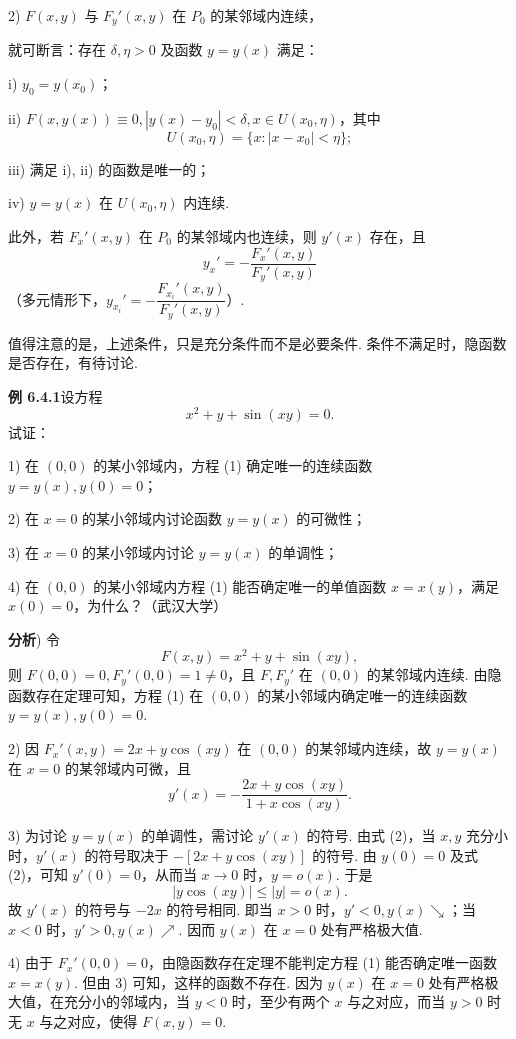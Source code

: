 \documentclass[UTF8,12pt,a4paper,fontset=fandol]{ctexart}
\begin{document}
2) $F(x,y)$ 与 $F_y'(x,y)$ 在 $P_0$ 的某邻域内连续，

\noindent 就可断言：存在 $\delta,\eta>0$ 及函数 $y=y(x)$ 满足：

i) $y_0=y(x_0)$；

ii) $F(x,y(x))\equiv0,|y(x)-y_0|<\delta,x\in U(x_0,\eta)$，其中
\[
  U(x_0,\eta)=\{x:|x-x_0|<\eta\};
\]

iii) 满足 i), ii) 的函数是唯一的；

iv) $y=y(x)$ 在 $U(x_0,\eta)$ 内连续.

此外，若 $F_x'(x,y)$ 在 $P_0$ 的某邻域内也连续，则 $y'(x)$ 存在，且
\[
  y_x'=-\frac{F_x'(x,y)}{F_y'(x,y)}
\]
（多元情形下，$y_{x_i}'=-\dfrac{F_{x_i}'(x,y)}{F_y'(x,y)}$）.

\noindent 值得注意的是，上述条件，只是充分条件而不是必要条件. 条件不满足时，隐函数是否存在，有待讨论.

\noindent\textbf{例 6.4.1}\quad 设方程
\begin{equation}
  x^2+y+\sin(xy)=0.
\end{equation}
试证：

1) 在 $(0,0)$ 的某小邻域内，方程 (1) 确定唯一的连续函数 $y=y(x),y(0)=0$；

2) 在 $x=0$ 的某小邻域内讨论函数 $y=y(x)$ 的可微性；

3) 在 $x=0$ 的某小邻域内讨论 $y=y(x)$ 的单调性；

4) 在 $(0,0)$ 的某小邻域内方程 (1) 能否确定唯一的单值函数 $x=x(y)$，满足 $x(0)=0$，为什么？（武汉大学）

\noindent\textbf{分析}) 令
\[
  F(x,y)=x^2+y+\sin(xy),
\]
则 $F(0,0)=0,F_y'(0,0)=1\ne0$，且 $F,F_y'$ 在 $(0,0)$ 的某邻域内连续. 由隐函数存在定理可知，方程 (1) 在 $(0,0)$ 的某小邻域内确定唯一的连续函数 $y=y(x),y(0)=0$.

2) 因 $F_x'(x,y)=2x+y\cos(xy)$ 在 $(0,0)$ 的某邻域内连续，故 $y=y(x)$ 在 $x=0$ 的某邻域内可微，且
\begin{equation}
  y'(x)=-\frac{2x+y\cos(xy)}{1+x\cos(xy)}.
\end{equation}

3) 为讨论 $y=y(x)$ 的单调性，需讨论 $y'(x)$ 的符号. 由式 (2)，当 $x,y$ 充分小时，$y'(x)$ 的符号取决于 $-[2x+y\cos(xy)]$ 的符号. 由 $y(0)=0$ 及式 (2)，可知 $y'(0)=0$，从而当 $x\to0$ 时，$y=o(x)$. 于是
\[
  |y\cos(xy)|\le |y|=o(x).
\]
故 $y'(x)$ 的符号与 $-2x$ 的符号相同. 即当 $x>0$ 时，$y'<0,y(x)\searrow$；当 $x<0$ 时，$y'>0,y(x)\nearrow$. 因而 $y(x)$ 在 $x=0$ 处有严格极大值.

4) 由于 $F_x'(0,0)=0$，由隐函数存在定理不能判定方程 (1) 能否确定唯一函数 $x=x(y)$. 但由 3) 可知，这样的函数不存在. 因为 $y(x)$ 在 $x=0$ 处有严格极大值，在充分小的邻域内，当 $y<0$ 时，至少有两个 $x$ 与之对应，而当 $y>0$ 时无 $x$ 与之对应，使得 $F(x,y)=0$.
\end{document}
